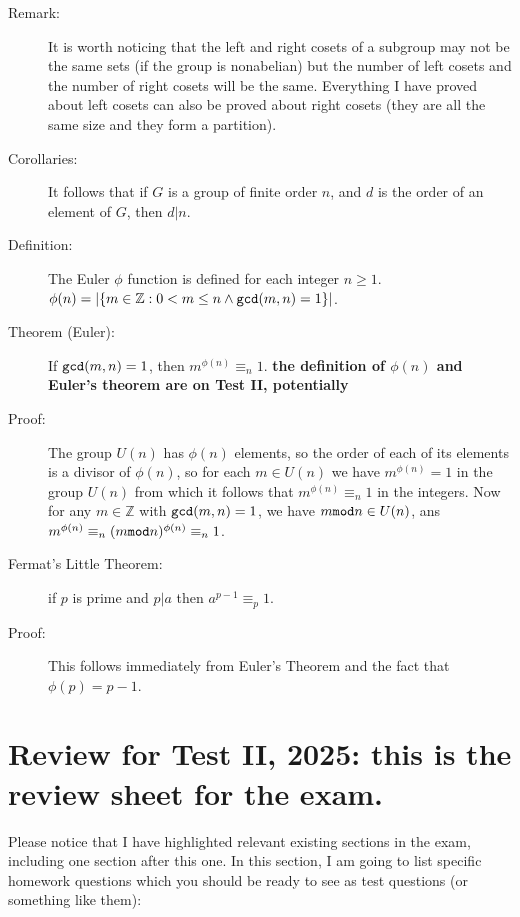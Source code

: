 \documentclass[12pt]{article}
\begin{document}
\begin{description}
\item[Remark:]  It is worth noticing that the left and right cosets of a subgroup may not be the same sets (if the group is nonabelian) but the number of left cosets and the number of right cosets will be the same.
Everything I have proved about left cosets can also be proved about right cosets (they are all the same size and they form a partition).

\item[Corollaries:]  It follows that if $G$ is a group of finite order $n$, and $d$ is the order of an element of $G$, then $d|n$.

\item[Definition:]  The Euler $\phi$ function is defined for each integer $n\geq 1$.  $\phi(n) = |\{m \in {\mathbb Z}:0 <m\leq n \wedge {\tt gcd}(m,n) = 1\}|$.

\item[Theorem (Euler):]  If ${\tt gcd}(m,n)=1$, then $m^{\phi(n)} \equiv_n 1$.  {\bf the definition of $\phi(n)$ and Euler's theorem are on Test II, potentially}

\item[Proof:]  The group $U(n)$ has $\phi(n)$ elements, so the order of each of its elements is a divisor of $\phi(n)$,
so for each $m \in U(n)$ we have $m^{\phi(n)}=1$ in the group $U(n)$ from which it follows that $m^{\phi(n)} \equiv_n 1$ in the integers.
Now for any $m \in {\mathbb Z}$ with ${\tt gcd}(m,n)=1$, we have $m {\tt mod} n \in U(n)$, ans $m^{\phi(n)} \equiv_n (m{\tt mod}n)^{\phi(n)} \equiv_n 1$.

\item[Fermat's Little Theorem:]  if $p$ is prime and $p|a$ then $a^{p-1}\equiv_p 1$.

\item[Proof:]  This follows immediately from Euler's Theorem and the fact that $\phi(p) = p-1$.

\end{description}


\section{Review for Test II, 2025:  this is the review sheet for the exam.}

Please notice that I have highlighted relevant existing sections in the exam, including one section after this one.  In this section, I am going to list specific homework questions which you should be ready to see as test questions (or something like them):
\end{document}

